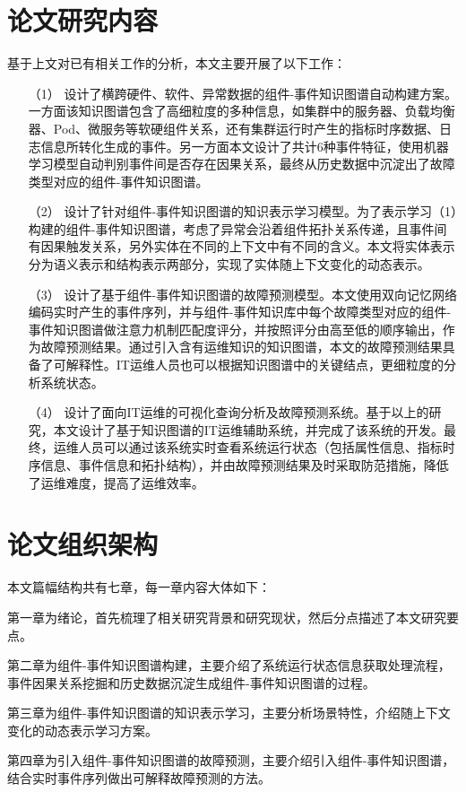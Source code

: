 \section{论文研究内容}
基于上文对已有相关工作的分析，本文主要开展了以下工作：
\begin{itemize}
    \item [（1）]设计了横跨硬件、软件、异常数据的组件-事件知识图谱自动构建方案。一方面该知识图谱包含了高细粒度的多种信息，如集群中的服务器、负载均衡器、Pod、微服务等软硬组件关系，还有集群运行时产生的指标时序数据、日志信息所转化生成的事件。另一方面本文设计了共计6种事件特征，使用机器学习模型自动判别事件间是否存在因果关系，最终从历史数据中沉淀出了故障类型对应的组件-事件知识图谱。
    \item [（2）]设计了针对组件-事件知识图谱的知识表示学习模型。为了表示学习（1）构建的组件-事件知识图谱，考虑了异常会沿着组件拓扑关系传递，且事件间有因果触发关系，另外实体在不同的上下文中有不同的含义。本文将实体表示分为语义表示和结构表示两部分，实现了实体随上下文变化的动态表示。
    \item [（3）]设计了基于组件-事件知识图谱的故障预测模型。本文使用双向记忆网络编码实时产生的事件序列，并与组件-事件知识库中每个故障类型对应的组件-事件知识图谱做注意力机制匹配度评分，并按照评分由高至低的顺序输出，作为故障预测结果。通过引入含有运维知识的知识图谱，本文的故障预测结果具备了可解释性。IT运维人员也可以根据知识图谱中的关键结点，更细粒度的分析系统状态。
    \item [（4）]设计了面向IT运维的可视化查询分析及故障预测系统。基于以上的研究，本文设计了基于知识图谱的IT运维辅助系统，并完成了该系统的开发。最终，运维人员可以通过该系统实时查看系统运行状态（包括属性信息、指标时序信息、事件信息和拓扑结构），并由故障预测结果及时采取防范措施，降低了运维难度，提高了运维效率。
\end{itemize}

\section{论文组织架构}
本文篇幅结构共有七章，每一章内容大体如下：

第一章为绪论，首先梳理了相关研究背景和研究现状，然后分点描述了本文研究要点。

第二章为组件-事件知识图谱构建，主要介绍了系统运行状态信息获取处理流程，事件因果关系挖掘和历史数据沉淀生成组件-事件知识图谱的过程。

第三章为组件-事件知识图谱的知识表示学习，主要分析场景特性，介绍随上下文变化的动态表示学习方案。

第四章为引入组件-事件知识图谱的故障预测，主要介绍引入组件-事件知识图谱，结合实时事件序列做出可解释故障预测的方法。

